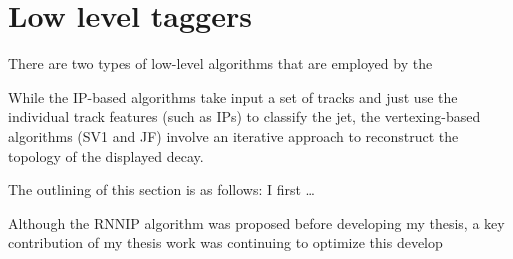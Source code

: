\section{Low level taggers}
\label{sec:low-level}

There are two types of low-level algorithms that are employed by the 

While the IP-based algorithms take input a set of tracks and just use the individual track features (such as IPs) to classify the jet, the vertexing-based algorithms (SV1 and JF) involve an iterative approach to reconstruct the topology of the displayed decay.

The outlining of this section is as follows: I first \ldots

Although the RNNIP algorithm was proposed before developing my thesis, a key contribution of my thesis work was continuing to optimize this develop







\FloatBarrier
\clearpage


%


